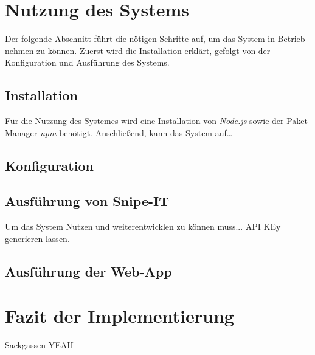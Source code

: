 \section{Nutzung des Systems}
Der folgende Abschnitt führt die nötigen Schritte auf, um das System in Betrieb
nehmen zu können. Zuerst wird die Installation erklärt, gefolgt von der Konfiguration und Ausführung
des Systems. 

\subsection{Installation}
Für die Nutzung des Systemes wird eine Installation von \textit{Node.js} sowie der Paket-Manager
\textit{npm} benötigt. Anschließend, kann das System auf\dots

\subsection{Konfiguration}


\subsection{Ausführung von Snipe-IT}
Um das System Nutzen und weiterentwicklen zu können muss... API KEy generieren
lassen.

\subsection{Ausführung der Web-App}



\section{Fazit der Implementierung}

Sackgassen YEAH
